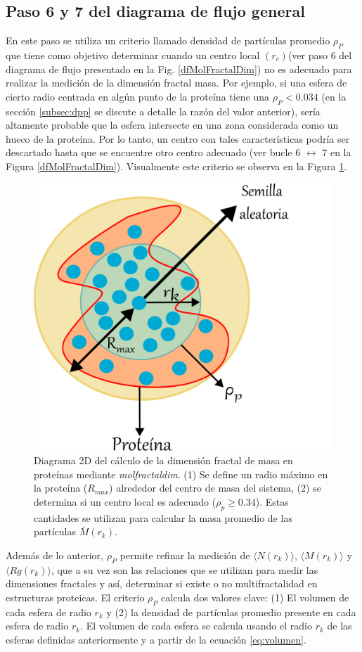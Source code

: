	 
	 

	 \subsection{Paso 6 y 7 del diagrama de flujo general}
	 \label{subsec:paso6}
	 
	 En este paso se utiliza un criterio llamado densidad de part\'{i}culas promedio $\rho_{P}$ que tiene como objetivo determinar cuando un centro local $(r_c)$(ver paso 6 del diagrama de flujo presentado en la Fig. \ref{dfMolFractalDim}) no es adecuado para realizar la medici\'{o}n de la dimensi\'{o}n fractal masa. Por ejemplo, si una esfera de cierto radio centrada en alg\'{u}n punto de la prote\'{i}na tiene una $\rho_{P} < 0.034$ (en la secci\'{o}n \ref{subsec:dpp} se discute a detalle la raz\'{o}n del valor anterior), ser\'{i}a altamente probable que la esfera intersecte en una zona considerada como un hueco de la prote\'{i}na. Por lo tanto, un centro con tales caracter\'{i}sticas podr\'{i}a ser descartado hasta que se encuentre otro centro adecuado (ver bucle 6 $\longleftrightarrow$ 7 en la Figura \ref{dfMolFractalDim}). Visualmente este criterio se observa en la Figura \ref{fig:centrob}. 
	 	 \color{black}
	 
	 	\begin{figure}[H]
	 	\centering
	 	\includegraphics[width=0.5\linewidth]{graphs/centrob4.pdf}
	 	\caption{Diagrama 2D del c\'{a}lculo de la dimensi\'{o}n fractal de masa en prote\'{i}nas mediante \textit{molfractaldim}. (1) Se define un radio m\'{a}ximo en la prote\'{i}na ($R_{max}$) alrededor del centro de masa del sistema, (2) se determina si un centro local es adecuado ($\rho_{p} \geq 0.34$). Estas cantidades se utilizan para calcular la masa promedio de las part\'{i}culas $\bar{M}(r_k)$.}
	 	\label{fig:centrob}
	 \end{figure}
	 
	  Adem\'{a}s de lo anterior, $\rho_{P}$ permite refinar la medici\'{o}n de $\langle N(r_k) \rangle$, $\langle M(r_k) \rangle$ y $\langle Rg(r_k) \rangle$, que a su vez son las relaciones que se utilizan para medir las dimensiones fractales y as\'{i}, determinar si existe o no multifractalidad en estructuras proteicas. El criterio $\rho_{P}$ calcula dos valores clave: (1) El volumen de cada esfera de radio $r_k$ y (2) la densidad de part\'{i}culas promedio presente en cada esfera de radio $r_k$. El volumen de cada esfera se calcula usando el radio $r_k$ de las esferas definidas anteriormente y a partir de la ecuaci\'{o}n \ref{eq:volumen}.\\
	 
